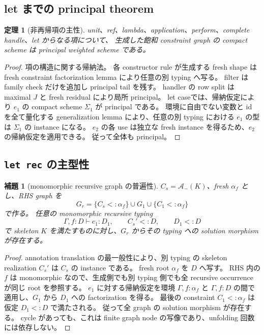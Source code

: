 \documentclass[uplatex,dvipdfmx,a4paper,10.5pt]{jsarticle}
\theoremstyle{jpplain}
\newtheorem{lemma}[definition]{補題}
\newtheorem{theorem}[definition]{定理}
\begin{document}
\subsection{let までの principal theorem}

\begin{theorem}[非再帰項の主性]
unit、ref、lambda、application、perform、complete handle、let からなる項について、
生成した飽和 constraint graph の compact scheme は principal weighted scheme である。
\end{theorem}

\begin{proof}
項の構造に関する帰納法。
各 constructor rule が生成する fresh shape は fresh constraint factorization lemma により任意の別 typing へ写る。
filter は family check だけを追加し principal tail を残す。
handler の row split は maximal $J$ と fresh residual により局所 principal。
let caseでは、帰納仮定により $e_1$ の compact scheme $\Sigma_1$ が principal である。
環境に自由でない変数と id を全て量化する generalization lemma により、任意の別 typing における $e_1$ の型は $\Sigma_1$ の instance になる。
$e_2$ の各 use は独立な fresh instance を得るため、$e_2$ の帰納仮定を適用できる。
従って全体も principal。
\end{proof}

\subsection{\texttt{let rec} の主型性}

\begin{lemma}[monomorphic recursive graph の普遍性]
$C_s=\mathcal A_-(K)$、fresh $\alpha_f$ とし、RHS graph を
\[
  G_r=\{C_s<:\alpha_f\}\cup G_1\cup\{C_1<:\alpha_f\}
\]
で作る。
任意の monomorphic recursive typing
\[
  \Gamma,f:D\vdash e_1:D_1,
  \qquad C_s' <: D,
  \qquad D_1<:D
\]
で skeleton $K$ を満たすものに対し、$G_r$ からその typing への solution morphism が存在する。
\end{lemma}

\begin{proof}
annotation translation の最一般性により、別 typing の skeleton realization $C_s'$ は $C_s$ の instance である。
fresh root $\alpha_f$ を $D$ へ写す。
RHS 内の $f$ は monomorphic なので、生成側でも別 typing 側でも全 recursive occurrence が同じ root を参照する。
$e_1$ に対する帰納仮定を環境 $\Gamma,f:\alpha_f$ と $\Gamma,f:D$ の間で適用し、$G_1$ から $D_1$ への factorization を得る。
最後の constraint $C_1<:\alpha_f$ は仮定 $D_1<:D$ で満たされる。
従って全 graph の solution morphism が存在する。
cycle があっても、これは finite graph node の写像であり、unfolding 回数には依存しない。
\end{proof}
\end{document}
